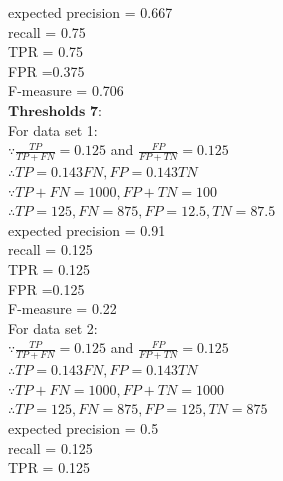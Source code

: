 \documentclass[12pt]{article}
\begin{document}
expected precision = 0.667\\

recall = 0.75\\

TPR = 0.75\\

FPR =0.375\\

F-measure = 0.706\\

$\textbf{Thresholds 7:}$ \\

For data set 1:\\

$\because \frac{TP}{TP+FN} = 0.125$ and $\frac{FP}{FP+TN} = 0.125$\\

$\therefore TP = 0.143FN, FP = 0.143TN$\\

$\because TP + FN = 1000, FP + TN = 100$\\

$\therefore TP = 125, FN = 875, FP = 12.5, TN = 87.5$\\

expected precision = 0.91\\

recall = 0.125\\

TPR = 0.125\\

FPR =0.125\\

F-measure = 0.22\\

For data set 2:\\

$\because \frac{TP}{TP+FN} = 0.125$ and $\frac{FP}{FP+TN} = 0.125$\\

$\therefore TP = 0.143FN, FP = 0.143TN$\\

$\because TP + FN = 1000, FP + TN = 1000$\\

$\therefore TP = 125, FN = 875, FP = 125, TN = 875$\\

expected precision = 0.5\\

recall = 0.125\\

TPR = 0.125\\
\end{document}
